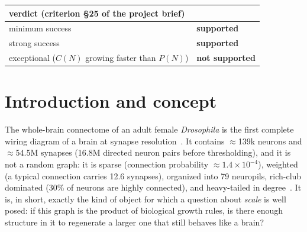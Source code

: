 \documentclass[11pt,a4paper]{article}
\begin{document}
\begin{abstract}
launch-bound) and biological-equivalent ($P_{\text{bio}} = P_0 N/N_0$ from nanowatt calorimetry,
a property of $N$ alone). The work is deliberately dual-implementation: a Python reference oracle
and a Vyb-native production path (loader, discrete-event runtime, GPU kernels), and the effort to
build the second one surfaced twelve compiler defects, of which the blocking one --- a
kernel-mode store that wrote eight bytes into a four-byte slot --- is documented, fixed upstream
and verified here. We report what failed as carefully as what worked: a closure test that
demonstrates invertibility rather than self-similarity, a capability curve censored at its test
grid, a geometry that helps prediction but not renormalization, and a GPU backend whose
equivalence to the CPU reference had to survive two independent bugs, one of them ours.
\end{abstract}

\vspace{0.6em}
\begin{center}
\small
\begin{tabular}{ll}
\toprule
verdict (criterion \S25 of the project brief) & \\
\midrule
minimum success & \textbf{supported} \\
strong success & \textbf{supported} \\
exceptional ($C(N)$ growing faster than $P(N)$) & \textbf{not supported} \\
\bottomrule
\end{tabular}
\end{center}

\clearpage
\setcounter{page}{1}

\section{Introduction and concept}
\label{sec:intro}

The whole-brain connectome of an adult female \textit{Drosophila} is the first complete wiring
diagram of a brain at synapse resolution~\cite{flywire-flagship,flywire-network}. It contains
$\approx$139k neurons and $\approx$54.5M synapses (16.8M directed neuron pairs before
thresholding), and it is not a random graph: it is sparse (connection probability
$\approx1.4\times10^{-4}$), weighted (a typical connection carries 12.6 synapses), organized into
79 neuropils, rich-club dominated (30\% of neurons are highly connected), and heavy-tailed in
degree~\cite{flywire-network}. It is, in short, exactly the kind of object for which a question
about \emph{scale} is well posed: if this graph is the product of biological growth rules, is
there enough structure in it to regenerate a larger one that still behaves like a brain?
\end{document}
